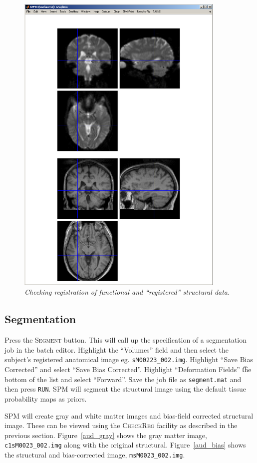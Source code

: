 \begin{figure}
\begin{center}
\includegraphics[width=100mm]{auditory/checkreg}
\caption{\em Checking registration of functional and ``registered'' structural data. \label{aud_checkreg}}
\end{center}
\end{figure}

\subsection{Segmentation}

Press the \textsc{Segment} button. This will call up the specification of a segmentation job in the batch editor. Highlight the ``Volumes'' field and then select the subject's registered anatomical image eg. \texttt{sM00223\_002.img}. Highlight ``Save Bias Corrected'' and select ``Save Bias Corrected''. Highlight ``Deformation Fields'' \t the bottom of the list and select ``Forward''. Save the job file as \texttt{segment.mat} and then press \texttt{RUN}. SPM will segment the structural image using the default tissue probability maps as priors. 

SPM will create gray and white matter images and bias-field corrected structural image. These can be viewed using the \textsc{CheckReg} facility as described in the previous section. Figure~\ref{aud_gray} shows the gray matter image, \texttt{c1sM0023\_002.img} along with the original structural. Figure~\ref{aud_bias} shows the structural and bias-corrected image, \texttt{msM0023\_002.img}.

